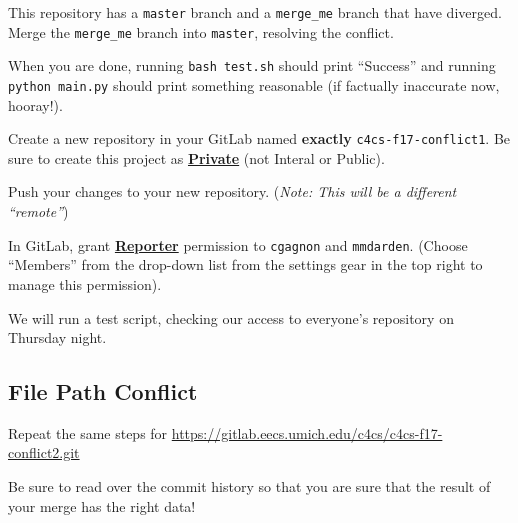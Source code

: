 \documentclass{article}
\begin{document}
This repository has a \texttt{master} branch and a \texttt{merge\_me} branch
that have diverged. Merge the \texttt{merge\_me} branch into \texttt{master},
resolving the conflict.

When you are done, running \texttt{bash test.sh} should print ``Success'' and
running \texttt{python main.py} should print something reasonable (if
factually inaccurate now, hooray!).

Create a new repository in your GitLab named \textbf{exactly}
\texttt{c4cs-f17-conflict1}.
Be sure to create this project as
\textbf{\ul{Private}} (not Interal or Public).

Push your changes to your new repository. (\emph{\small Note: This will be a
  different ``remote''})

In GitLab, grant \textbf{\ul{Reporter}} permission to \texttt{cgagnon} and
\texttt{mmdarden}.
(Choose ``Members'' from the drop-down list from the settings gear in the top
right to manage this permission).

We will run a test script, checking our access to everyone's repository on
Thursday night.

\subsection{File Path Conflict}

Repeat the same steps for
\url{https://gitlab.eecs.umich.edu/c4cs/c4cs-f17-conflict2.git}

Be sure to read over the commit history so that you are sure that the result
of your merge has the right data!
\end{document}
